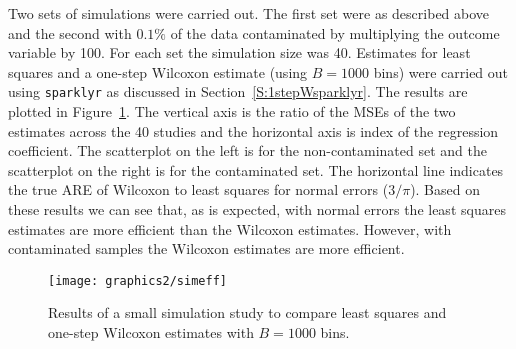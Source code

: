 Two sets of simulations were carried out.  The first set were as described above and the second with $0.1\%$ of the data contaminated by multiplying the outcome variable by 100.  For each set the simulation size was 40.
Estimates for least squares and a one-step Wilcoxon estimate (using $B=1000$ bins) were carried out using \verb|sparklyr| \citep{sparklyr} as discussed in Section~\ref{S:1stepWsparklyr}.
The results are plotted in Figure~\ref{simeff}.
The vertical axis is the ratio of the MSEs of the two estimates across the 40 studies and the horizontal axis is index of the regression coefficient.
The scatterplot on the left is for the non-contaminated set and the scatterplot on the right is for the contaminated set.
The horizontal line indicates the true ARE of Wilcoxon to least squares for normal errors ($3/\pi$).
Based on these results we can see that, as is expected, with normal errors the least squares estimates are more efficient than the Wilcoxon estimates.  However, with contaminated samples the Wilcoxon estimates are more efficient.

\begin{figure}
\centering
\texttt{[image: graphics2/simeff]}
\caption{Results of a small simulation study to compare least squares and one-step Wilcoxon estimates with $B=1000$ bins.}  
\label{simeff}
\end{figure}

